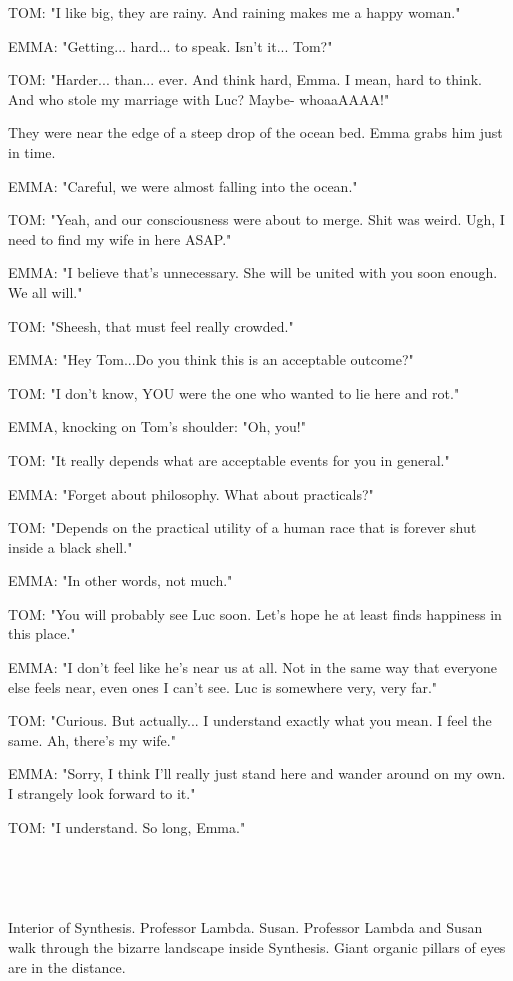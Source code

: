 \documentclass[11pt]{article}
\begin{document}
TOM: "I like big, they are rainy.
And raining makes me a happy woman."

EMMA: "Getting... hard... to speak. 
Isn't it... Tom?"

TOM: "Harder... than... ever.
And think hard, Emma.
I mean, hard to think.
And who stole my marriage with Luc?
Maybe- whoaaAAAA!"

They were near the edge of a steep drop of the ocean bed. 
Emma grabs him just in time.

EMMA: "Careful, we were almost falling into the ocean."

TOM: "Yeah, and our consciousness were about to merge. 
Shit was weird.
Ugh, I need to find my wife in here ASAP."

EMMA: "I believe that's unnecessary. 
She will be united with you soon enough.
We all will."

TOM: "Sheesh, that must feel really crowded."

EMMA: "Hey Tom...Do you think this is an acceptable outcome?"

TOM: "I don't know, YOU were the one who wanted to lie here and rot."

EMMA, knocking on Tom's shoulder: "Oh, you!"

TOM: "It really depends what are acceptable events for you in general."

EMMA: "Forget about philosophy.
What about practicals?"

TOM: "Depends on the practical utility of a human race that is forever shut inside a black shell."

EMMA: "In other words, not much."

TOM: "You will probably see Luc soon.
Let's hope he at least finds happiness in this place."

EMMA: "I don't feel like he's near us at all.
Not in the same way that everyone else feels near, even ones I can't see.
Luc is somewhere very, very far."

TOM: "Curious. But actually... I understand exactly what you mean.
I feel the same.
Ah, there's my wife."

EMMA: "Sorry, I think I'll really just stand here and wander around on my own.
I strangely look forward to it."

TOM: "I understand. So long, Emma."

\ 

\ 

Interior of Synthesis.
Professor Lambda. Susan. 
Professor Lambda and Susan walk through the bizarre landscape inside Synthesis.
Giant organic pillars of eyes are in the distance.
\end{document}
